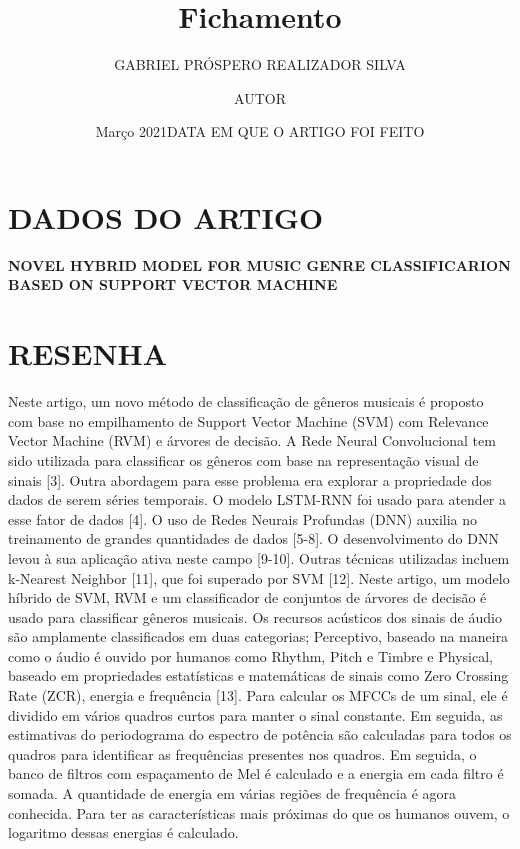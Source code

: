 \documentclass{article}
\title{Fichamento}
\author{GABRIEL PRÓSPERO REALIZADOR  SILVA}
\date{Março 2021}
\begin{document}
\maketitle

\section{DADOS DO ARTIGO}
\textbf{NOVEL HYBRID MODEL FOR MUSIC GENRE CLASSIFICARION BASED ON SUPPORT VECTOR MACHINE\\}
\author{AUTOR \\}
\date{DATA EM QUE O ARTIGO FOI FEITO}

\section{RESENHA}
Neste artigo, um novo método de classificação de gêneros musicais é proposto com base no empilhamento de Support Vector Machine (SVM) com Relevance Vector Machine (RVM) e árvores de decisão.
A Rede Neural Convolucional tem sido utilizada para classificar os gêneros com base na representação visual de sinais [3].
Outra abordagem para esse problema era explorar a propriedade dos dados de serem séries temporais. O modelo LSTM-RNN foi usado para atender a esse fator de dados [4]. O uso de Redes Neurais Profundas (DNN) auxilia no treinamento de grandes quantidades de dados [5-8]. O desenvolvimento do DNN levou à sua aplicação ativa neste campo [9-10]. Outras técnicas utilizadas incluem k-Nearest Neighbor [11], que foi superado por SVM [12]. Neste artigo, um modelo híbrido de SVM, RVM e um classificador de conjuntos de árvores de decisão é usado para classificar gêneros musicais.
Os recursos acústicos dos sinais de áudio são amplamente classificados em duas categorias; Perceptivo, baseado na maneira como o áudio é ouvido por humanos como Rhythm, Pitch e Timbre e Physical, baseado em propriedades estatísticas e matemáticas de sinais como Zero Crossing Rate (ZCR), energia e frequência [13].
Para calcular os MFCCs de um sinal, ele é dividido em vários quadros curtos para manter o sinal constante. Em seguida, as estimativas do periodograma do espectro de potência são calculadas para todos os quadros para identificar as frequências presentes nos quadros. Em seguida, o banco de filtros com espaçamento de Mel é calculado e a energia em cada filtro é somada. A quantidade de energia em várias regiões de frequência é agora conhecida. Para ter as características mais próximas do que os humanos ouvem, o logaritmo dessas energias é calculado.
\end{document}
